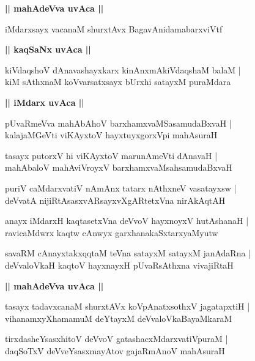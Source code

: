 \documentclass[twoside,12pt,openright]{book}
\newcounter{shloka}[chapter]
\def\uvaca#1{\centerline{{\large\textbf{#1}}}}
\begin{document}
\uvaca{|| mahAdeVva uvAca ||}

\begin{shloka}%
iMdarxsayx vacanaM shurxtAvx BagavAnidamabarxviVtf 
\end{shloka}

\uvaca {|| kaqSaNx uvAca ||}

\begin{shloka}%
kiVdaqshoV dAnavashayxkarx kinAnxmAkiVdaqshaM balaM |\\
kiM sAthxnaM koVvarsatxsayx bUrxhi satayxM puraMdara
\end{shloka}

\uvaca{|| iMdarx uvAca ||}

\begin{shloka}%
pUvaRmeVva mahAbAhoV barxhamxvaMSasamudaBxvaH |\\
kalajaMGeVti viKAyxtoV hayxtuyxgorxVpi mahAsuraH 
\end{shloka}

\begin{shloka}%
tasayx putorxV hi viKAyxtoV marunAmeVti dAnavaH |\\
mahAbaloV mahAviVroyxV barxhamxvaMsahsamudaBxvaH
\end{shloka}

\begin{shloka}%
puriV caMdarxvatiV nAmAnx tatarx nAthxneV vasatayxsw |\\
deVvatA nijiRtAsasxvARsayxvXgARtetxVna nirAkAqtAH
\end{shloka}

\begin{shloka}%
anayx iMdarxH kaqtasetxVna deVvoV hayxnoyxV hutAshanaH |\\
ravicaMdwrx kaqtw cAnwyx garxhanakaSxtarxyaMyutw
\end{shloka}

\begin{shloka}%
savaRM cAnayxtakxqqtaM teVna satayxM satayxM janAdaRna |\\
deVvaloVkaH kaqtoV hayxnayxH pUvaRsAthxna vivajiRtaH
\end{shloka}

\uvaca{|| mahAdeVva uvAca ||}

\begin{shloka}%
tasayx tadavxcanaM shurxtAVx koVpAnatxsothxV jagatapxtiH |\\
vihanamxyXhamamuM deYtayxM deVvaloVkaBayaMkaraM 
\end{shloka}

\begin{shloka}%
tirxdasheYsasxhitoV deVvoV gatashacxMdarxvatiVpuraM |\\
daqSoTxV deVveYsasxmayAtov gajaRmAnoV mahAsuraH 
\end{shloka}
\end{document}
